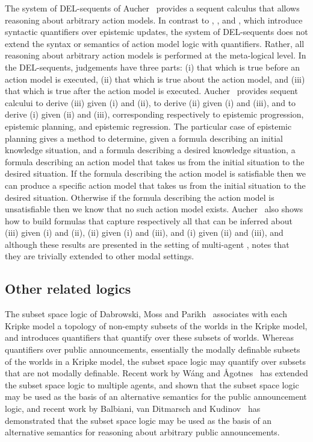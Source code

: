 The system of DEL-sequents of Aucher~\cite{aucher:2011,aucher:2012} provides a sequent calculus that allows reasoning about arbitrary action models.
In contrast to \logicApal{}, \logicGal{}, and \logicCal{}, which introduce syntactic quantifiers over epistemic updates, the system of DEL-sequents does not extend the syntax or semantics of action model logic with quantifiers.
Rather, all reasoning about arbitrary action models is performed at the meta-logical level.
In the DEL-sequents, judgements have three parts: (i) that which is true before an action model is executed, (ii) that which is true about the action model, and (iii) that which is true after the action model is executed.
Aucher~\cite{aucher:2011,aucher:2012} provides sequent calcului to derive (iii) given (i) and (ii), to derive (ii) given (i) and (iii), and to derive (i) given (ii) and (iii), corresponding respectively to epistemic progression, epistemic planning, and epistemic regression.
The particular case of epistemic planning gives a method to determine, given a formula describing an initial knowledge situation, and a formula describing a desired knowledge situation, a formula describing an action model that takes us from the initial situation to the desired situation.
If the formula describing the action model is satisfiable then we can produce a specific action model that takes us from the initial situation to the desired situation.
Otherwise if the formula describing the action model is unsatisfiable then we know that no such action model exists.
Aucher~\cite{aucher:2011,aucher:2012} also shows how to build formulas that capture respectively all that can be inferred about (iii) given (i) and (ii), (ii) given (i) and (iii), and (i) given (ii) and (iii), and although these results are presented in the setting of multi-agent \classK{}, notes that they are trivially extended to other modal settings.

\subsection{Other related logics}

The subset space logic of Dabrowski, Moss and Parikh~\cite{dabrowski:1996} associates with each Kripke model a topology of non-empty subsets of the worlds in the Kripke model, and introduces quantifiers that quantify over these subsets of worlds.
Whereas \logicApal{} quantifiers over public announcements, essentially the modally definable subsets of the worlds in a Kripke model, the subset space logic may quantify over subsets that are not modally definable.
Recent work by W{\'a}ng and {\AA}gotnes~\cite{wang:2013a,wang:2013b} has extended the subset space logic to multiple agents, and shown that the subset space logic may be used as the basis of an alternative semantics for the public announcement logic, and recent work by Balbiani, van Ditmarsch and Kudinov~\cite{balbiani:2013} has demonstrated that the subset space logic may be used as the basis of an alternative semantics for reasoning about arbitrary public announcements.

